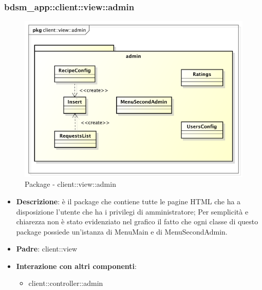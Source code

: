 \subsubsection{bdsm\_app::client::view::admin} %
\label{ssub:bdsm_app_client_view_admin}
\begin{figure}[htbp]
	\centering
	\centerline{\includegraphics[scale=0.5]{./images/client/client_view_admin.pdf}}
	\caption{Package - client::view::admin}
\end{figure}

\begin{itemize}
	\item \textbf{Descrizione}: è il package che contiene tutte le pagine HTML che ha a disposizione l'utente che ha i privilegi di amministratore;\newline
	Per semplicità e chiarezza non è stato evidenziato nel grafico il fatto che ogni classe di questo package possiede un'istanza di MenuMain e di MenuSecondAdmin.
	\item \textbf{Padre}: client::view
	\item \textbf{Interazione con altri componenti}:
		\begin{itemize}
			\item client::controller::admin
		\end{itemize}
\end{itemize}

